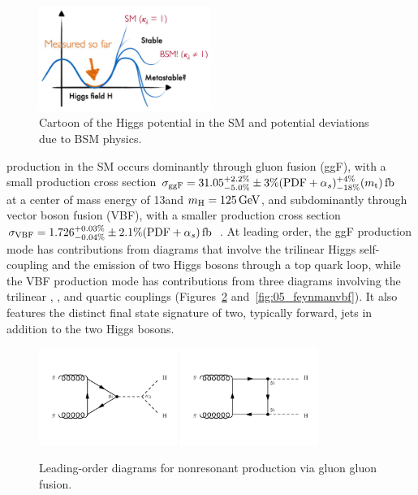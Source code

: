 \begin{figure}[ht]
	\centering
	\includegraphics[width=0.5\textwidth]{figures/01-SM-03-SM/higgs/higgs_potential}
	\caption{Cartoon of the Higgs potential in the SM and potential deviations due to BSM physics.}
	\label{fig:01_sm_higgs_potential}
\end{figure}

\HH production in the SM occurs dominantly through gluon fusion (ggF), with a small production cross section $\sigma_{\mathrm{ggF}} = 31.05^{+2.2\%}_{-5.0\%} \pm 3\% (\textrm{PDF}+\alpha_s)^{+4\%}_{-18\%} (m_\textrm{t})\text{\,fb}$~\cite{Grazzini:2018bsd,Baglio:2020wgt} at a center of mass energy of 13\TeV and $m_{\textrm{H}} = 125\,\text{Ge\hspace{-.08em}V}$, and subdominantly through vector boson fusion (VBF), with a smaller production cross section $\sigma_{\mathrm{VBF}} = 1.726^{+0.03\%}_{-0.04\%} \pm 2.1\% (\textrm{PDF}+\alpha_s)\text{\,fb}$~\cite{LHCHiggsCrossSectionWorkingGroup:2016ypw}.
At leading order, the ggF production mode has contributions from diagrams that involve the trilinear \HHH Higgs self-coupling and the emission of two Higgs bosons through a top quark loop, while the VBF production mode has contributions from three diagrams involving the trilinear \HHH, \HVV, and quartic \HHVV couplings (Figures~\ref{fig:05_feynmanggf} and~\ref{fig:05_feynmanvbf}).
It also features the distinct final state signature of two, typically forward, jets in addition to the two Higgs bosons.

\begin{figure}[htb] %
    \centering
    \includegraphics[width=0.4\textwidth]{figures/05-HH/production/diagrams/feynman_02.pdf}
    \includegraphics[width=0.4\textwidth]{figures/05-HH/production/diagrams/feynman_01.pdf}
    \caption{Leading-order diagrams for nonresonant \HH production via gluon gluon fusion.}
    \label{fig:05_feynmanggf}
\end{figure}  
    
